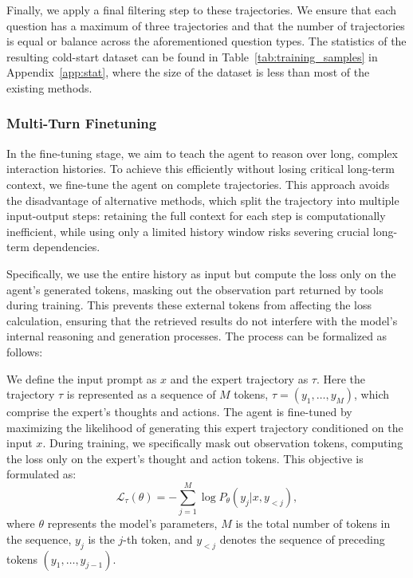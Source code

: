 Finally, we apply a final filtering step to these trajectories. We ensure that each question has a maximum of three trajectories and that the number of trajectories is equal or balance across the aforementioned question types. The statistics of the resulting cold-start dataset can be found in Table~\ref{tab:training_samples} in Appendix~\ref{app:stat}, where the size of the dataset is less than most of the existing methods.

\subsubsection{Multi-Turn Finetuning}
In the fine-tuning stage, we aim to teach the agent to reason over long, complex interaction histories. To achieve this efficiently without losing critical long-term context, we fine-tune the agent on complete trajectories. This approach avoids the disadvantage of alternative methods, which split the trajectory into multiple input-output steps: retaining the full context for each step is computationally inefficient, while using only a limited history window risks severing crucial long-term dependencies.

Specifically, we use the entire history as input but compute the loss only on the agent's generated tokens, masking out the observation part returned by tools during training. This prevents these external tokens from affecting the loss calculation, ensuring that the retrieved results do not interfere with the model's internal reasoning and generation processes. The process can be formalized as follows: 


We define the input prompt as $x$ and the expert trajectory as $\tau$. Here the trajectory $\tau$ is represented as a sequence of $M$ tokens, $\tau = (y_1, \dots, y_M)$, which comprise the expert's thoughts and actions. The agent is fine-tuned by maximizing the likelihood of generating this expert trajectory conditioned on the input $x$. During training, we specifically mask out observation tokens, computing the loss only on the expert's thought and action tokens. This objective is formulated as:
\begin{equation}
\mathcal{L}_\tau(\theta) = -\sum_{j=1}^{M} \log P_\theta(y_j | x, y_{<j}),
\end{equation}
where $\theta$ represents the model's parameters, $M$ is the total number of tokens in the sequence, $y_j$ is the $j$-th token, and $y_{<j}$ denotes the sequence of preceding tokens $(y_1, \dots, y_{j-1})$.


